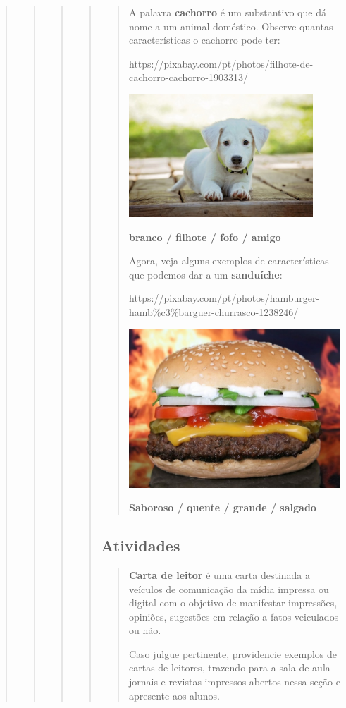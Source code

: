 \begin{quote}
\begin{quote}
\begin{quote}
\begin{quote}
\begin{quote}
A palavra \textbf{cachorro} é um substantivo que dá nome a um animal
doméstico. Observe quantas características o cachorro pode ter:

https://pixabay.com/pt/photos/filhote-de-cachorro-cachorro-1903313/

\includegraphics[width=2.71875in,height=1.81239in]{media/image21.jpeg}

\textbf{branco / filhote / fofo / amigo}

Agora, veja alguns exemplos de características que podemos dar a um
\textbf{sanduíche}:

https://pixabay.com/pt/photos/hamburger-hamb\%c3\%barguer-churrasco-1238246/

\includegraphics[width=3.11183in,height=2.34375in]{media/image22.jpeg}

\textbf{Saboroso / quente / grande / salgado}
\end{quote}

\subsection{Atividades}\label{atividades-6}

\begin{quote}
\textbf{Carta de leitor} é uma carta destinada a veículos de comunicação
da mídia impressa ou digital com o objetivo de manifestar impressões,
opiniões, sugestões em relação a fatos veiculados ou não.

Caso julgue pertinente, providencie exemplos de cartas de leitores,
trazendo para a sala de aula jornais e revistas impressos abertos nessa
seção e apresente aos alunos.
\end{quote}


\end{quote}
\end{quote}
\end{quote}
\end{quote}
